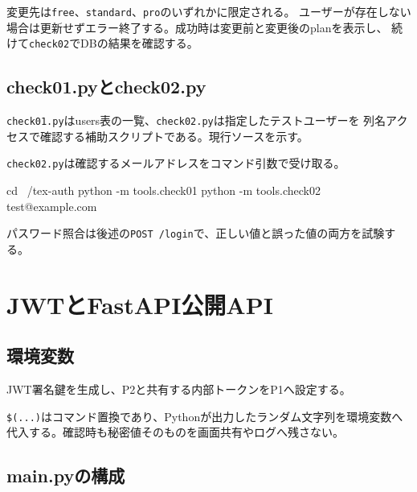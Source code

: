\documentclass[uplatex,dvipdfmx,a4paper,11pt]{jsarticle}
\begin{document}
変更先は\texttt{free}、\texttt{standard}、\texttt{pro}のいずれかに限定される。
ユーザーが存在しない場合は更新せずエラー終了する。成功時は変更前と変更後のplanを表示し、
続けて\texttt{check02}でDBの結果を確認する。

\subsection{check01.pyとcheck02.py}

\texttt{check01.py}はusers表の一覧、\texttt{check02.py}は指定したテストユーザーを
列名アクセスで確認する補助スクリプトである。現行ソースを示す。





\texttt{check02.py}は確認するメールアドレスをコマンド引数で受け取る。

\begin{command}
cd ~/tex-auth
python -m tools.check01
python -m tools.check02 test@example.com
\end{command}

パスワード照合は後述の\texttt{POST /login}で、正しい値と誤った値の両方を試験する。

\section{JWTとFastAPI公開API}

\subsection{環境変数}

JWT署名鍵を生成し、P2と共有する内部トークンをP1へ設定する。


\texttt{\$(...)}はコマンド置換であり、Pythonが出力したランダム文字列を環境変数へ
代入する。確認時も秘密値そのものを画面共有やログへ残さない。

\subsection{main.pyの構成}
\end{document}
